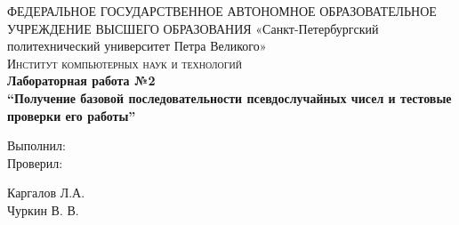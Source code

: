 \documentclass{article}
\begin{document}
	\begin{titlepage}
		\center 
		ФЕДЕРАЛЬНОЕ ГОСУДАРСТВЕННОЕ АВТОНОМНОЕ ОБРАЗОВАТЕЛЬНОЕ УЧРЕЖДЕНИЕ ВЫСШЕГО ОБРАЗОВАНИЯ\linebreak  
		«Санкт-Петербургский политехнический университет Петра Великого»\\[2cm]
		\textsc{\Large Институт компьютерных наук и технологий}\\[6.5cm]
		
		{\huge \bfseries Лабораторная работа №2\\[0.4cm]
			\Large \mdseries “Получение базовой последовательности псевдослучайных чисел и тестовые проверки его работы”}\\[6.5cm]
		
		\begin{multicols}{2}
			\begin{flushright} \large
				
				{Выполнил:}\\[0.5cm]
				
				{Проверил:}
				
			\end{flushright}
			\begin{flushright}
				
				{Каргалов Л.А.}\\[0.5cm]
				
				{Чуркин В. В.}
				
			\end{flushright}
		\end{multicols}

		\flushright{
			{\today}\\[0.5cm]
		}
		
		\vfill %
	\end{titlepage}
	
	\tableofcontents
	\setcounter{page}{2}
	\newpage
		
\end{document}
